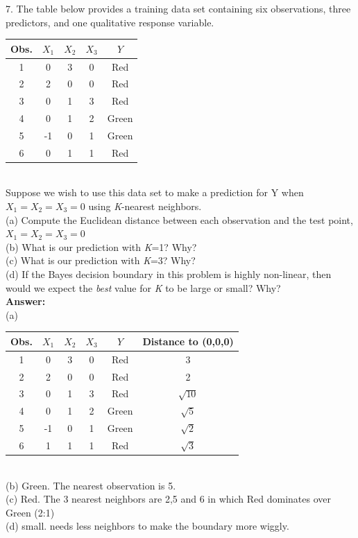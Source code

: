 \documentclass[12pt]{article}
\begin{document}
7. The table below provides a training data set containing six observations, three predictors, and one qualitative response variable.\\
\begin{table}[ht]
        \centering
        \begin{tabular}{  c | c | c | c | c}
        \hline
          Obs. & $X_1$&$X_2$&$X_3$&$Y$\\
          \hline 
          1 & 0&3&0&Red\\
          2 & 2&0&0&Red\\
          3 & 0&1&3&Red\\
          4 & 0&1&2&Green\\
          5 & -1&0&1&Green\\
          6 & 0&1&1&Red\\
          \hline
            
            
            
        \end{tabular}
    \end{table}\\
Suppose we wish to use this data set to make a prediction for Y when $X_1=X_2=X_3=0$ using \textit{K}-nearest neighbors. \\
(a) Compute the Euclidean distance between each observation and the test point,   $X_1=X_2=X_3=0$\\
(b) What is our prediction with \textit{K}=1? Why?\\
(c) What is our prediction with \textit{K}=3? Why?\\
(d) If the Bayes decision boundary in this problem is highly non-linear, then would we expect the \textit{best} value for \textit{K} to be large or small? Why?\\
\textbf{Answer:}\\
(a) 
\begin{table}[ht]
        \centering
        \begin{tabular}{  c | c | c | c | c|c}
        \hline
          Obs. & $X_1$&$X_2$&$X_3$&$Y$& Distance to (0,0,0)\\
          \hline 
          1 & 0&3&0&Red&3\\
          2 & 2&0&0&Red&2\\
          3 & 0&1&3&Red&$\sqrt{10}$\\
          4 & 0&1&2&Green&$\sqrt{5}$\\
          5 & -1&0&1&Green&$\sqrt{2}$\\
          6 & 1&1&1&Red&$\sqrt{3}$\\
          \hline
            
            
            
        \end{tabular}
    \end{table}\\
(b) Green. The nearest observation is 5. \\
(c) Red. The 3 nearest neighbors are 2,5 and 6 in which Red dominates over Green (2:1)\\
(d) small. needs less neighbors to make the boundary more wiggly. 
\end{document}

